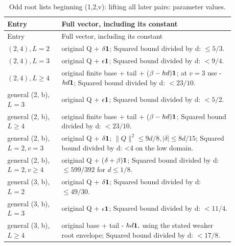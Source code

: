 \begingroup\small
\setlength{\tabcolsep}{3pt}
\setlength{\LTleft}{0pt}\setlength{\LTright}{\fill}
\begin{longtable}{@{}p{0.2200\linewidth}p{0.7000\linewidth}@{}}
\caption{Odd root lists beginning (1,2,v): lifting all later pairs: parameter values.}\label{tab:parameters:q5-c185:1}\\
\toprule
Entry & Full vector, including its constant \\
\midrule\endfirsthead
\toprule
Entry & Full vector, including its constant \\
\midrule\endhead
\bottomrule\endfoot
\((2,\allowbreak 4),\allowbreak  L=2\) & original Q + \(\delta\mathbf1\); Squared bound divided by d: \(\le 5/3\). \\
\addlinespace[2pt]
\((2,\allowbreak 4),\allowbreak  L=3\) & original Q + \(\epsilon\mathbf1\); Squared bound divided by d: \(<9/4\). \\
\addlinespace[2pt]
\((2,\allowbreak 4),\allowbreak  L\ge 4\) & original finite base + tail + (\(\beta-hd)\mathbf1\); at \(v=3\) use -\(hd\mathbf1\); Squared bound divided by d: \(<23/10\). \\
\addlinespace[2pt]
general (2, b), \(L=3\) & original Q + \(\epsilon\mathbf1\); Squared bound divided by d: \(<5/2\). \\
\addlinespace[2pt]
general (2, b), \(L\ge 4\) & original finite base + tail + (\(\beta-hd)\mathbf1\); Squared bound divided by d: \(<23/10\). \\
\addlinespace[2pt]
general (2, b), \(L=2,\allowbreak  v=3\) & original Q + \(\delta\mathbf1\); \(\lVert Q\rVert ^2\le 9d/8,\allowbreak  \lvert \delta\rvert \le 8d/15\); Squared bound divided by d: <4 on the low domain. \\
\addlinespace[2pt]
general (2, b), \(L=2,\allowbreak  v\ge 4\) & original Q + (\(\delta+\beta)\mathbf1\); Squared bound divided by d: \ensuremath{\le}\(599/392\) for \(d\le 1/8\). \\
\addlinespace[2pt]
general (3, b), \(L=2\) & original Q + \(\delta\mathbf1\); Squared bound divided by d: \(\le 49/30\). \\
\addlinespace[2pt]
general (3, b), \(L=3\) & original Q + \(\epsilon\mathbf1\); Squared bound divided by d: \(<11/4\). \\
\addlinespace[2pt]
general (3, b), \(L\ge 4\) & original base + tail - \(hd\mathbf1,\allowbreak \) using the stated weaker root envelope; Squared bound divided by d: \(<17/8\). \\
\end{longtable}
\endgroup


